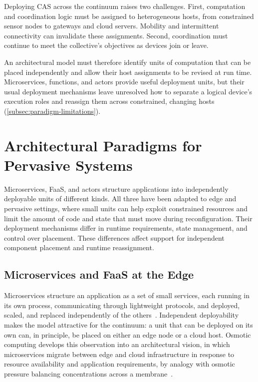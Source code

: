 Deploying \ac{CAS} across the continuum raises two challenges.
%
First, computation and coordination logic must be assigned to heterogeneous hosts,
from constrained sensor nodes to gateways and cloud servers.
Mobility and intermittent connectivity can invalidate these assignments.
%
Second, coordination must continue to meet the collective's objectives as devices join or leave.

An architectural model must therefore identify units of computation that can be placed independently
and allow their host assignments to be revised at run time.
Microservices, functions, and actors provide useful deployment units,
but their usual deployment mechanisms leave unresolved how to separate a logical device's execution roles and reassign them across constrained, changing hosts
(\cref{subsec:paradigm-limitations}).

\section{Architectural Paradigms for Pervasive Systems}
\label{sec:architectural-paradigms}

Microservices, \ac{FaaS}, and actors structure applications into independently deployable units of different kinds.
All three have been adapted to edge and pervasive settings,
where small units can help exploit constrained resources and limit the amount of code and state that must move during reconfiguration.
Their deployment mechanisms differ in runtime requirements,
state management,
and control over placement.
These differences affect support for independent component placement and runtime reassignment.

\subsection{Microservices and FaaS at the Edge}
\label{subsec:microservices-faas-edge}

Microservices structure an application as a set of small services,
each running in its own process,
communicating through lightweight protocols,
and deployed,
scaled,
and replaced independently of the others~\cite{DBLP:books/sp/17/DragoniGLMMMS17}.
%
Independent deployability makes the model attractive for the continuum:
a unit that can be deployed on its own can,
in principle,
be placed on either an edge node or a cloud host.
%
Osmotic computing develops this observation into an architectural vision,
in which microservices migrate between edge and cloud infrastructure in response to resource availability and application requirements,
by analogy with osmotic pressure balancing concentrations across a membrane~\cite{DBLP:journals/cloudcomp/VillariFDRR16}.

